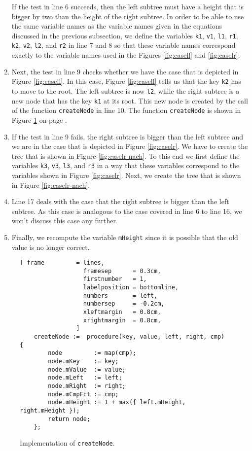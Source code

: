 \begin{enumerate}
      If the test in line 6 succeeds, then the left subtree must have a height that is bigger by
      two than the height of the right subtree.  In order to be able to use the same variable names 
      as the variable names given in the equations discussed in the previous subsection, we define
      the variables \texttt{k1}, \texttt{v1}, \texttt{l1}, \texttt{r1}, \texttt{k2}, \texttt{v2}, \texttt{l2},
      and \texttt{r2} in line 7 and 8 so that these variable names correspond exactly to the variable names
      used in the Figures \ref{fig:casell} and \ref{fig:caselr}.
\item Next, the test in line 9 checks whether we have the case that is depicted in Figure
      \ref{fig:casell}.  In this case, Figure \ref{fig:casell} tells us that the key \texttt{k2}
      has to move to the root.  The left subtree is now \texttt{l2}, while the right subtree is a
      new node that has the key \texttt{k1} at its root.  This new node is created by the call
      of the function \texttt{createNode} in line 10.  The function \texttt{createNode} is shown in
      Figure \ref{fig:avl-tree.stlx:createNode} on page \pageref{fig:avl-tree.stlx:createNode}.
\item If the test in line 9 fails, the right subtree is bigger than the left subtree and we are in 
      the case that is depicted in Figure \ref{fig:caselr}.  We have to create the tree that is
      shown in Figure \ref{fig:caselr-nach}.  To this end we first define the variables 
      \texttt{k3}, \texttt{v3}, \texttt{l3}, and \texttt{r3} in a way that these variables
      correspond to the variables shown in Figure \ref{fig:caselr}.  Next, we create the tree
      that is shown in Figure \ref{fig:caselr-nach}.
\item Line 17 deals with the case that the right subtree is bigger than the left subtree. 
      As this case is analogous to the case covered in line 6 to line 16, we won't discuss this case
      any further.
\item Finally, we recompute the variable \texttt{mHeight} since it is possible that the old value is
      no longer correct.
\end{enumerate}


\begin{figure}[!ht]
\centering
\begin{Verbatim}[ frame         = lines, 
                  framesep      = 0.3cm, 
                  firstnumber   = 1,
                  labelposition = bottomline,
                  numbers       = left,
                  numbersep     = -0.2cm,
                  xleftmargin   = 0.8cm,
                  xrightmargin  = 0.8cm,
                ]
    createNode :=  procedure(key, value, left, right, cmp) {
        node         := map(cmp);
        node.mKey    := key;
        node.mValue  := value;
        node.mLeft   := left;
        node.mRight  := right;
        node.mCmpFct := cmp;
        node.mHeight := 1 + max({ left.mHeight, right.mHeight });
        return node;
    };
\end{Verbatim}
\vspace*{-0.3cm}
\caption{Implementation of \texttt{createNode}.}
\label{fig:avl-tree.stlx:createNode}
\end{figure}

